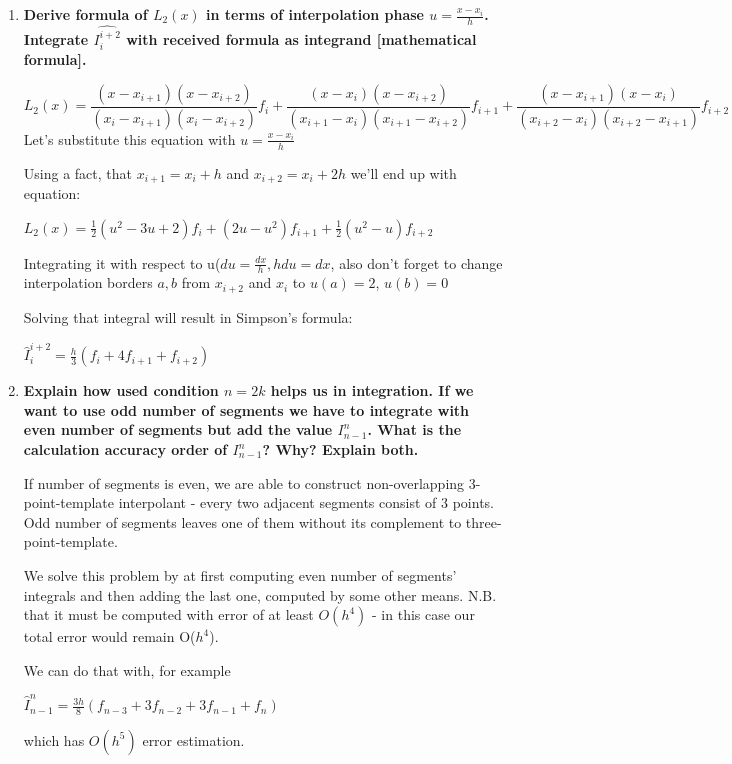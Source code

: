 \documentclass{article}
\begin{document}
\begin{enumerate}
    \item \textbf{Derive formula of $L_{2}(x)$ in terms of interpolation phase $ u = \frac{x - x_{i}}{h} $. Integrate $ \hat{I_{i}^{i+2}}$ with received formula as integrand [mathematical formula].}
    
    $$
    L_2(x) = \frac{(x-x_{i+1})(x-x_{i+2})}{(x_i-x_{i+1})(x_i-x_{i+2})}f_i + 
    \frac{(x-x_{i})(x-x_{i+2})}{(x_{i+1}-x_{i})(x_{i+1}-x_{i+2})}f_{i+1} + 
    \frac{(x-x_{i+1})(x-x_i)}{(x_{i+2}-x_i)(x_{i+2}-x_{i+1})}f_{i+2}
    $$
    Let's substitute this equation with  $u=\frac{x-x_i}{h}$
    
    Using a fact, that $x_{i+1} = x_i+h$ and $x_{i+2} = x_i+2h$
    we'll end up with equation:
    
   $ L_2(x)=\frac{1}{2}(u^2-3u+2)f_i + (2u-u^2)f_{i+1} + \frac{1}{2}(u^2-u)f_{i+2}$
   
   Integrating it with respect to u($du = \frac{dx}{h}, hdu = dx$, also don't forget to change interpolation borders ${a, b}$ from $x_{i+2}$ and $x_{i}$ to $u(a) = 2$, $u(b) = 0$
   
   Solving that integral will result in Simpson's formula:
   
    $\hat{I}^{i+2}_{i} = \frac{h}{3}(f_i+4f_{i+1}+f_{i+2})$
    
    \item \textbf{Explain how used condition $n = 2k$ helps us in integration. If we want to use odd number of segments we have to integrate with even number of segments but add the value $I_{n-1}^n$. What is the calculation accuracy order of $I_{n-1}^n$? Why? Explain both.}
    
    If number of segments is even, we are able to construct non-overlapping 3-point-template interpolant - every two adjacent segments consist of 3 points. Odd number of segments leaves one of them without its complement to three-point-template.
    
    We solve this problem by at first computing even number of segments' integrals and then adding the last one, computed by some other means. N.B. that it must be computed with error of at least $O(h^4)$ - in this case our total error would remain O($h^4$).
    
    We can do that with, for example
    
    $\hat{I}^{n}_{n-1} = \frac{3h}{8}(f_{n-3}+3f_{n-2}+3f_{n-1}+f_n)$
    
    which has $O(h^5)$ error estimation.
    

\end{enumerate}
\end{document}

